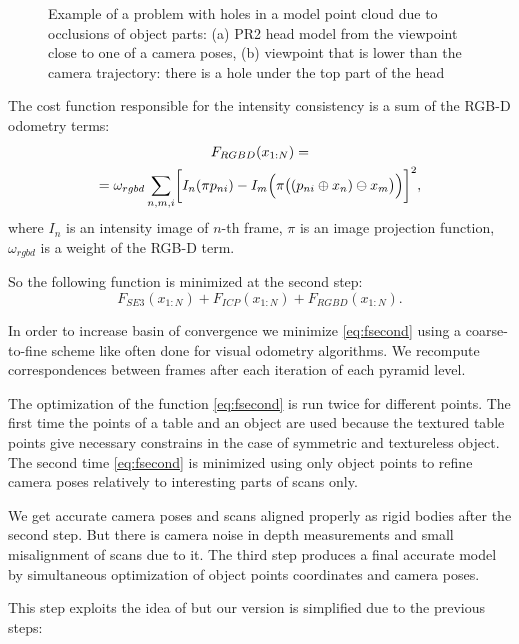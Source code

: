 \documentclass[letterpaper, 10 pt, conference]{ieeeconf}  %
\begin{document}
\begin{figure}[t]
\begin{subfigure}[b]{0.45\linewidth}
                \caption{}
        \end{subfigure}
        \caption{Example of a problem with holes in a model point cloud 
        due to occlusions of object parts:
        (a) PR2 head model from the viewpoint close to one of a camera poses,
        (b) viewpoint that is lower than the camera trajectory: there is a hole under 
        the top part of the head}
        \label{fig:pr2}
\end{figure}

The cost function responsible for the intensity consistency is
a sum of the RGB-D odometry terms:
\begin{multline} \label{eq:frgbd}
F_{RGBD}(x_{1:N}) = \\
= \omega_{rgbd} \sum_{n,m,i} \biggl[I_n(\pi p_{ni}) - I_m\Bigl(\pi \bigl((p_{ni} \oplus x_n) \ominus x_m\bigr)\Bigr) \biggr]^2,
\end{multline}
where $I_n$ is an intensity image of $n$-th frame, $\pi$ is an image projection function, $\omega_{rgbd}$
is a weight of the RGB-D term.

So the following function is minimized at the second step:
\begin{equation} \label{eq:fsecond}
F_{SE3}(x_{1:N}) + F_{ICP}(x_{1:N}) + F_{RGBD}(x_{1:N}).
\end{equation}

In order to increase basin of convergence 
we minimize \eqref{eq:fsecond} using a coarse-to-fine scheme 
like often done for visual odometry algorithms. 
We recompute correspondences between frames
after each iteration of each pyramid level.

The optimization of the function \eqref{eq:fsecond} is run 
twice for different points. The first time the points of a table and an object are used  because 
the textured table points give necessary constrains in the case of symmetric and textureless object.
The second time \eqref{eq:fsecond} is minimized using only object points to refine 
camera poses relatively to interesting parts of scans only.

We get accurate camera poses and scans aligned properly 
as rigid bodies after the second step. But there is camera noise in depth measurements and small 
misalignment of scans due to it. The third step produces a final accurate model by
simultaneous optimization of object points coordinates and camera poses.

This step exploits the idea of \cite{ruhnke2012highly} but our version 
is simplified due to the previous steps: 
\end{document}
